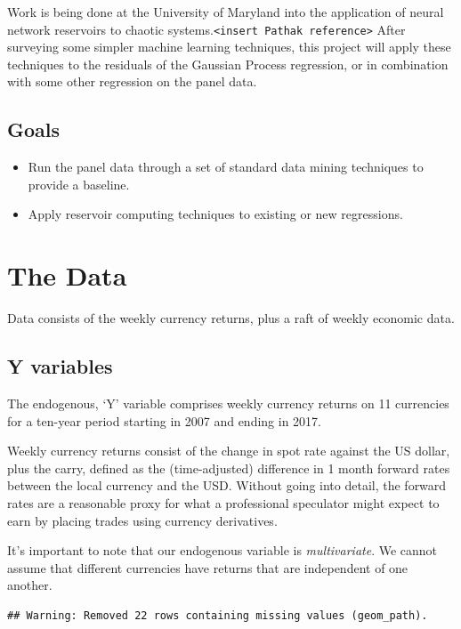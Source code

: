 \documentclass[]{article}
\providecommand{\tightlist}{%
  \setlength{\itemsep}{0pt}\setlength{\parskip}{0pt}}
\begin{document}
Work is being done at the University of Maryland into the application of
neural network reservoirs to chaotic
systems.\texttt{\textless{}insert\ Pathak\ reference\textgreater{}}
After surveying some simpler machine learning techniques, this project
will apply these techniques to the residuals of the Gaussian Process
regression, or in combination with some other regression on the panel
data.

\subsection{Goals}\label{goals}

\begin{itemize}
\tightlist
\item
  Run the panel data through a set of standard data mining techniques to
  provide a baseline.
\item
  Apply reservoir computing techniques to existing or new regressions.
\end{itemize}

\section{The Data}\label{the-data}

Data consists of the weekly currency returns, plus a raft of weekly
economic data.

\subsection{Y variables}\label{y-variables}

The endogenous, `Y' variable comprises weekly currency returns on 11
currencies for a ten-year period starting in 2007 and ending in 2017.

Weekly currency returns consist of the change in spot rate against the
US dollar, plus the carry, defined as the (time-adjusted) difference in
1 month forward rates between the local currency and the USD. Without
going into detail, the forward rates are a reasonable proxy for what a
professional speculator might expect to earn by placing trades using
currency derivatives.

It's important to note that our endogenous variable is
\emph{multivariate}. We cannot assume that different currencies have
returns that are independent of one another.

\begin{verbatim}
## Warning: Removed 22 rows containing missing values (geom_path).
\end{verbatim}
\end{document}
